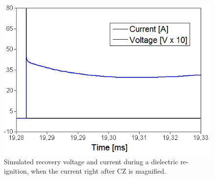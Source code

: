 \documentclass[10pt,b5paper,twoside]{article}
\begin{document}
\begin{figure}[H]
\centering
\includegraphics[scale=0.65]{Bilder/Results/ATPdraw_ZOOM_CurrentandVoltage_2_label.png}
\caption{Simulated recovery voltage and current during a dielectric re-ignition, when the current right after CZ is magnified.} \label{fig:DR_ATP_ZOOM}
\end{figure}

\cleardoublepage
\end{document}
